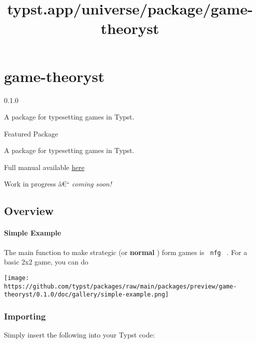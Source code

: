 \title{typst.app/universe/package/game-theoryst}

\label{banner}
\section{game-theoryst}\label{game-theoryst}

{ 0.1.0 }

A package for typesetting games in Typst.

{ } Featured Package

\label{readme}
A package for typesetting games in Typst.

Full manual available
\href{https://github.com/typst/packages/raw/main/packages/preview/game-theoryst/0.1.0/doc/gtheoryst-manual.pdf}{here}

Work in progress â€`` \emph{coming soon!}

\subsection{Overview}\label{overview}

\paragraph{Simple Example}\label{simple-example}

The main function to make strategic (or \textbf{normal} ) form games is
\texttt{\ nfg\ } . For a basic 2x2 game, you can do

\begin{Shaded}
\begin{Highlighting}[]
\NormalTok{  [$10, 10$], [$2, 20$], }
\NormalTok{  [$20, 2$], [$5, 5$],}
\NormalTok{)}
\end{Highlighting}
\end{Shaded}

\texttt{[image: https://github.com/typst/packages/raw/main/packages/preview/game-theoryst/0.1.0/doc/gallery/simple-example.png]}

\subsubsection{Importing}\label{importing}

Simply insert the following into your Typst code:

